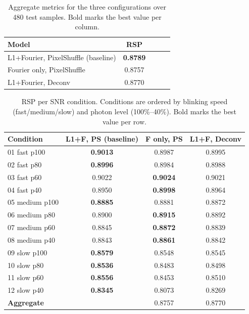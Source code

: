 \begin{table}[htbp]
  \centering
  \caption{Aggregate metrics for the three configurations over 480 test samples.
           Bold marks the best value per column.}
  \label{tab:ablation_aggregate}
  \begin{tabular}{lcccc}
    \toprule
    \textbf{Model} & \textbf{RSP}  \\
    \midrule
    L1+Fourier, PixelShuffle (baseline) & \textbf{0.8789} \\
    Fourier only, PixelShuffle          & 0.8757          \\
    L1+Fourier, Deconv                  & 0.8770          \\
    \bottomrule
  \end{tabular}
\end{table}

\begin{table}[htbp]
  \centering
  \caption{RSP per SNR condition. Conditions are ordered by blinking speed
           (fast/medium/slow) and photon level (100\%--40\%). Bold marks the best
           value per row.}
  \label{tab:ablation_per_snr}
  \begin{tabular}{lccc}
    \toprule
    \textbf{Condition} & \textbf{L1+F, PS (baseline)} & \textbf{F only, PS} & \textbf{L1+F, Deconv} \\
    \midrule
    01 fast p100  & \textbf{0.9013} & 0.8987 & 0.8995 \\
    02 fast p80   & \textbf{0.8996} & 0.8984 & 0.8988 \\
    03 fast p60   & 0.9022          & \textbf{0.9024} & 0.9021 \\
    04 fast p40   & 0.8950          & \textbf{0.8998} & 0.8964 \\
    \midrule
    05 medium p100 & \textbf{0.8885} & 0.8881 & 0.8872 \\
    06 medium p80  & 0.8900          & \textbf{0.8915} & 0.8892 \\
    07 medium p60  & 0.8845          & \textbf{0.8872} & 0.8839 \\
    08 medium p40  & 0.8843          & \textbf{0.8861} & 0.8842 \\
    \midrule
    09 slow p100   & \textbf{0.8579} & 0.8548 & 0.8545 \\
    10 slow p80    & \textbf{0.8536} & 0.8483 & 0.8498 \\
    11 slow p60    & \textbf{0.8556} & 0.8453 & 0.8510 \\
    12 slow p40    & \textbf{0.8345} & 0.8073 & 0.8269 \\
    \midrule
    \textbf{Aggregate} & 
     & 0.8757 & 0.8770 \\
    \bottomrule
  \end{tabular}
\end{table}

